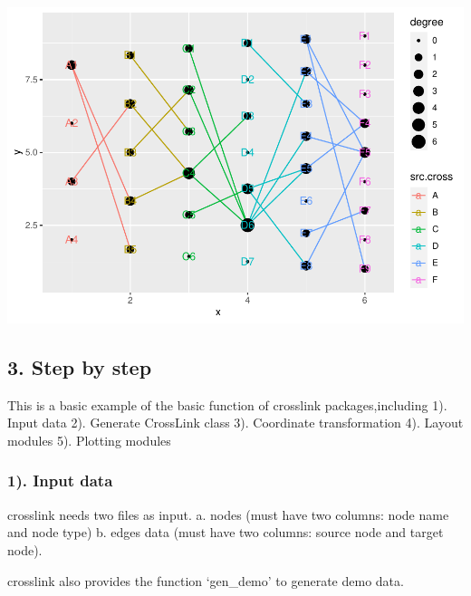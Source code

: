 \documentclass[
]{article}
\newenvironment{Shaded}{\begin{snugshade}}{\end{snugshade}}
\newcommand{\CommentTok}[1]{\textcolor[rgb]{0.56,0.35,0.01}{\textit{#1}}}
\newcommand{\DataTypeTok}[1]{\textcolor[rgb]{0.13,0.29,0.53}{#1}}
\newcommand{\DecValTok}[1]{\textcolor[rgb]{0.00,0.00,0.81}{#1}}
\newcommand{\KeywordTok}[1]{\textcolor[rgb]{0.13,0.29,0.53}{\textbf{#1}}}
\newcommand{\NormalTok}[1]{#1}
\newcommand{\OperatorTok}[1]{\textcolor[rgb]{0.81,0.36,0.00}{\textbf{#1}}}
\newcommand{\StringTok}[1]{\textcolor[rgb]{0.31,0.60,0.02}{#1}}
\begin{document}
\includegraphics{ReadMe_files/figure-latex/unnamed-chunk-3-1.pdf}

\hypertarget{step-by-step}{%
\subsection{3. Step by step}\label{step-by-step}}

This is a basic example of the basic function of crosslink
packages,including 1). Input data 2). Generate CrossLink class 3).
Coordinate transformation 4). Layout modules 5). Plotting modules

\hypertarget{input-data}{%
\subsubsection{1). Input data}\label{input-data}}

crosslink needs two files as input. a. nodes (must have two columns:
node name and node type) b. edges data (must have two columns: source
node and target node).

crosslink also provides the function `gen\_demo' to generate demo data.

\begin{Shaded}
\end{Shaded}
\end{document}
